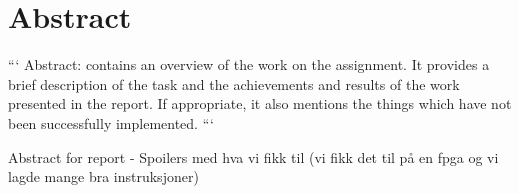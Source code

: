 \section{Abstract}

```
Abstract: contains an overview of the work on the assignment.
It provides a brief description of the task and the achievements and results of the work presented in the report.
If appropriate, it also mentions the things which have not been successfully implemented.
```

Abstract for report
- Spoilers med hva vi fikk til (vi fikk det til på en fpga og vi lagde mange bra instruksjoner)
